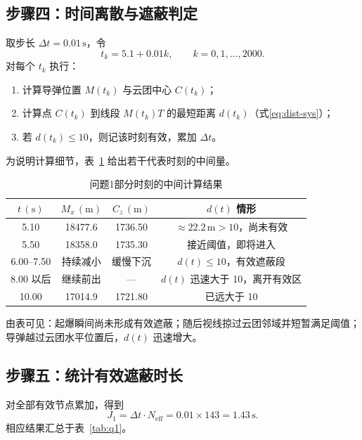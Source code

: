 \documentclass[withoutpreface,bwprint]{cumcmthesis}
\begin{document}
\subsection{步骤四：时间离散与遮蔽判定}
取步长 $\Delta t=0.01\,\mathrm{s}$，令
\[
t_k=5.1+0.01k,\qquad
k=0,1,\ldots,2000.
\]
对每个 $t_k$ 执行：
\begin{enumerate}
  \item 计算导弹位置 $M(t_k)$ 与云团中心 $C(t_k)$；
  \item 计算点 $C(t_k)$ 到线段 $M(t_k)T$ 的最短距离 $d(t_k)$（式\eqref{eq:dist-sys}）；
  \item 若 $d(t_k)\le 10$，则记该时刻有效，累加 $\Delta t$。
\end{enumerate}
为说明计算细节，表~\ref{tab:q1-sample} 给出若干代表时刻的中间量。

\begin{table}[!htbp]
\centering
\caption{问题1部分时刻的中间计算结果}
\label{tab:q1-sample}
\begin{tabular}{cccc}
\toprule[1.5pt]
$t\,(\mathrm{s})$ & $M_x\,(\mathrm{m})$ & $C_z\,(\mathrm{m})$ & $d(t)$ 情形 \\
\midrule[1pt]
5.10 & 18477.6 & 1736.50 & $\approx 22.2\,\mathrm{m}>10$，尚未有效 \\
5.50 & 18358.0 & 1735.30 & 接近阈值，即将进入 \\
6.00--7.50 & 持续减小 & 缓慢下沉 & $d(t)\le 10$，有效遮蔽段 \\
8.00 以后 & 继续前出 & --- & $d(t)$ 迅速大于 10，离开有效区 \\
10.00 & 17014.9 & 1721.80 & 已远大于 10 \\
\bottomrule[1.5pt]
\end{tabular}
\end{table}

由表可见：起爆瞬间尚未形成有效遮蔽；随后视线掠过云团邻域并短暂满足阈值；导弹越过云团水平位置后，$d(t)$ 迅速增大。

\subsection{步骤五：统计有效遮蔽时长}
对全部有效节点累加，得到
\begin{equation}
J_1=\Delta t\cdot N_{\mathrm{eff}}=0.01\times 143=1.43\,\mathrm{s}.
\end{equation}
相应结果汇总于表~\ref{tab:q1}。
\end{document}
